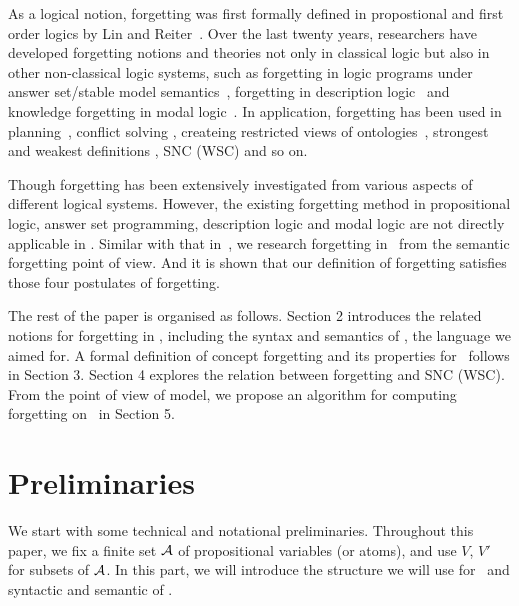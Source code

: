 \documentclass{article}
\begin{document}
As a logical notion, forgetting was first formally defined
in propostional and first order logics by Lin and Reiter~\cite{lin1994forget}.
Over the last twenty years, researchers have developed forgetting notions and theories not only in classical logic but also in other non-classical logic systems, such as forgetting in logic programs under answer set/stable model semantics~\cite{DBLP:Zhang:AIJ2006,Eiter2008Semantic,Wong:PhD:Thesis,Yisong:KR:2012,Yisong:IJCAI:2013}, forgetting in description logic~\cite{Wang:AMAI:2010,Lutz:IJCAI:2011,zhao2017role} and knowledge forgetting in modal logic~\cite{Yan:AIJ:2009,Kaile:JAIR:2009,Yongmei:IJCAI:2011,fang2019forgetting}. In application, forgetting has been used in planning~\cite{lin2003compiling},  conflict solving \cite{Lang2010Reasoning,Zhang2005Solving},
createing restricted views of ontologies~\cite{ZhaoSchmidt18a}, strongest and weakest definitions \cite{Lang2008On}, SNC (WSC) \cite{DBLP:journals/ai/Lin01} and so on.

Though forgetting has been extensively investigated from various aspects of different logical systems.
However, the existing forgetting method in propositional
logic, answer set programming, description logic and modal logic are not directly applicable in \CTL.
Similar with that in~\cite{Yan:AIJ:2009}, we research forgetting in \CTL\ from the semantic forgetting point of view.
And it is shown that our definition of forgetting satisfies those four postulates of forgetting.

The rest of the paper is organised as follows. Section 2 introduces the related notions for forgetting in \CTL, including the syntax and semantics of \CTL, the language we aimed for.
A formal definition of concept forgetting and its properties for \CTL\ follows in Section 3.
Section 4 explores the relation between forgetting and SNC (WSC).
From the point of view of model, we propose an algorithm for computing forgetting on \CTL\ in Section 5.







 \section{Preliminaries}
 We start with some technical and notational preliminaries. Throughout this paper, we fix a finite set ${\cal A}$ of propositional variables (or atoms), and use $V$, $V'$ for subsets of ${\cal A}$. In this part, we will introduce the structure we will use for \CTL\ and syntactic and semantic of \CTL.
\end{document}
